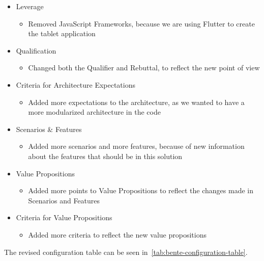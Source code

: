 \begin{itemize}
    \item Leverage
    \begin{itemize}
        \item Removed JavaScript Frameworks, because we are using Flutter to create the tablet application
    \end{itemize}
    \item Qualification
    \begin{itemize}
        \item Changed both the Qualifier and Rebuttal, to reflect the new point of view
    \end{itemize}
    \item Criteria for Architecture Expectations
    \begin{itemize}
        \item Added more expectations to the architecture, as we wanted to have a more modularized architecture in the code
    \end{itemize}
    \item Scenarios \& Features
    \begin{itemize}
        \item Added more scenarios and more features, because of new information about the features that should be in this solution
    \end{itemize}
    \item Value Propositions
    \begin{itemize}
        \item Added more points to Value Propositions to reflect the changes made in Scenarios and Features
    \end{itemize}
    \item Criteria for Value Propositions
    \begin{itemize}
        \item Added more criteria to reflect the new value propositions 
    \end{itemize}
\end{itemize}

The revised configuration table can be seen in~\autoref{tab:bente-configuration-table}.

